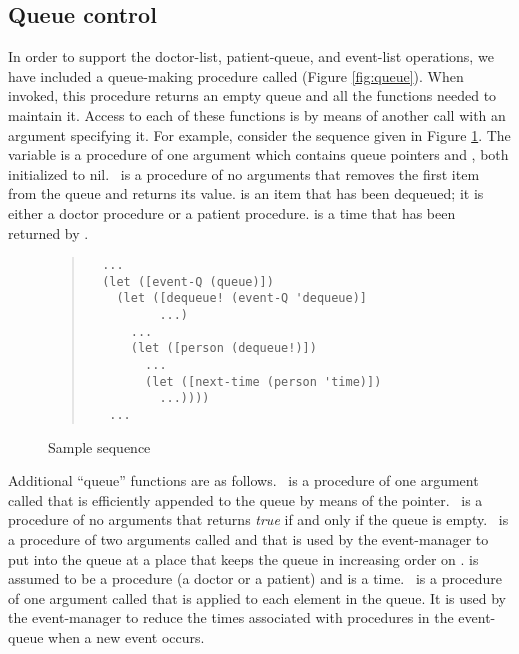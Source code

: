 \subsection{Queue control}

In order to support the doctor-list, patient-queue, and event-list operations,
we have included a queue-making procedure called 
(Figure \ref{fig:queue}).  When invoked,
this procedure returns an empty queue and all the functions needed to maintain
it.  Access to each of these functions is by means of another call with an
argument specifying it.  For example, consider the sequence given in Figure
\ref{fig:seq}.
The variable  is a procedure of one argument which contains
queue pointers  and , both initialized to nil.
\ is a procedure of no arguments that removes the first
item from the queue and returns its value.   is an item
that has been dequeued; it is either a doctor procedure or a patient
procedure.  is a time that has been returned by .

\begin{figure}
\begin{frameit}
\begin{quote}
\begin{verbatim}
  ...
  (let ([event-Q (queue)])
    (let ([dequeue! (event-Q 'dequeue)]
          ...)
      ...
      (let ([person (dequeue!)])
        ...
        (let ([next-time (person 'time)])
          ...))))
   ...
\end{verbatim}
\end{quote}
\caption{Sample sequence}
\label{fig:seq}
\end{frameit}
\end{figure}

Additional ``queue'' functions are as follows.  \ is a procedure
of one argument called  that is efficiently appended to the
queue by means of the  pointer.  \ is a procedure of
no arguments that returns {\it true} if and only if the queue is empty.
\ is a procedure of two arguments called  and
 that is used by the event-manager to put  into the
queue at a place that keeps the queue in increasing order on .
 is assumed to be a procedure (a doctor or a patient) and
 is a time.  \ is a procedure of one argument
called  that is applied to each element in the queue.  It is used
by the event-manager to reduce the times associated with procedures in the
event-queue when a new event occurs.


